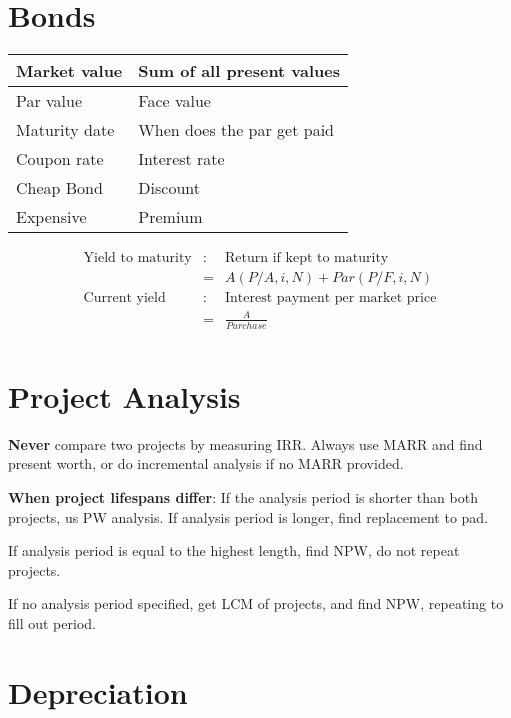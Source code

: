 \documentclass[landscape, letterpaper, 10pt]{article}
\begin{document}
\begin{multicols}{3}
    \section*{Bonds}
    \begin{tabular}{|l|l|}
        \hline
        Market value  & Sum of all present values  \\\hline
        Par value     & Face value                 \\\hline
        Maturity date & When does the par get paid \\\hline
        Coupon rate   & Interest rate              \\\hline
        Cheap Bond    & Discount                   \\\hline
        Expensive     & Premium                    \\\hline
    \end{tabular}
    \begin{align*}
        \text{Yield to maturity} & : & \text{Return if kept to maturity}        \\
                                 & = & A(P/A, i, N) + Par(P/F, i, N)            \\
        \text{Current yield}     & : & \text{Interest payment per market price} \\
                                 & = & \frac{A}{Purchase}                       \\
    \end{align*}
    \section*{Project Analysis}
    \textbf{Never} compare two projects by measuring IRR. Always use MARR and find present worth, or do incremental analysis if no MARR provided.

    \textbf{When project lifespans differ}: If the analysis period is shorter than both projects, us PW analysis. If analysis period is longer, find replacement to pad.

    If analysis period is equal to the highest length, find NPW, do not repeat projects.

    If no analysis period specified, get LCM of projects, and find NPW, repeating to fill out period.

    \section*{Depreciation}

\end{multicols}
\end{document}
